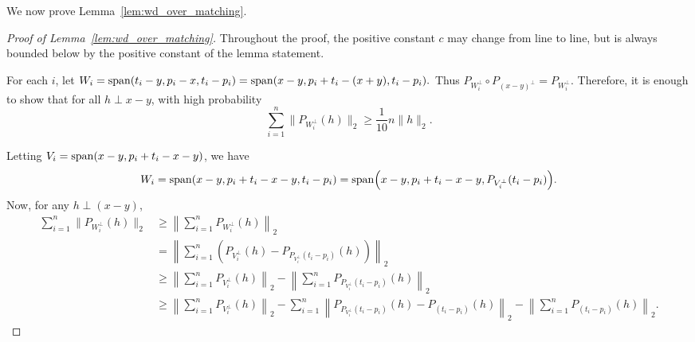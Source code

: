We now prove Lemma~\ref{lem:wd_over_matching}.

\begin{proof}[Proof of Lemma~\ref{lem:wd_over_matching}]

Throughout the proof, the positive constant $c$ may change from line to line, but is always bounded below by the positive constant of the lemma statement.

For each $i$, let $
W_i = \operatorname{span}(t_i - y, p_i -x, t_i - p_i) =\operatorname{span}( x-y, p_i + t_i - (x+y), t_i-p_i).
$
Thus $P_{W_i^\perp} \circ P_{(x-y)^\perp} = P_{W_i^\perp}$. Therefore, it is enough to show that for all $h \perp x-y$, with high probability
\[
\sum_{i=1}^n \| P_{W_i^\perp}( h) \|_2 \geq \frac{1}{10}n \|h\|_2.
\]

Letting $V_i = \operatorname{span}(x-y, p_i + t_i - x -y)$, we have
\[
W_i = \operatorname{span}( x-y, p_i + t_i - x-y, t_i-p_i) = \operatorname{span} \Bigl( x-y, p_i + t_i - x-y, P_{V_i^\perp}(t_i-p_i) \Bigr).
\]
Now, for any $h \perp (x-y)$, 
\begin{align*}
\sum_{i=1}^n \| P_{W_i^\perp}(h)\|_2  
& \geq \left\| \sum_{i=1}^n P_{W_i^\perp}( h) \right\|_2 \\
& = \left\| \sum_{i=1}^n \left(P_{V_i^\perp}( h) - P_{P_{V_i^\perp}(t_i-p_i)}(h) \right) \right\|_2 \\
& \geq \left\| \sum_{i=1}^n P_{V_i^\perp}( h)\right\|_2  - \left\| \sum_{i=1}^n P_{P_{V_i^\perp}(t_i-p_i)}(h)  \right\|_2 \\
& \geq \left\| \sum_{i=1}^n P_{V_i^\perp}( h)\right\|_2  - \sum_{i=1}^n \left\| P_{P_{V_i^\perp}(t_i-p_i)}(h) - P_{(t_i-p_i)}(h) \right\|_2 - \left\|\sum_{i=1}^n P_{(t_i-p_i)}(h)\right\|_2.
\end{align*}


\end{proof}
